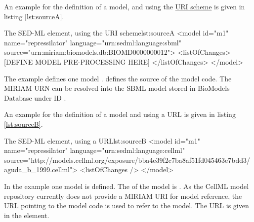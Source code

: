 An example for the definition of a model, and using the  \hyperref[sec:uriScheme]{URI scheme} is given in listing \ref{lst:sourceA}.
%
\begin{myXmlLst}{The SED-ML  element, using the URI scheme}{lst:sourceA}
 <model id="m1" name="repressilator" language="urn:sedml:language:sbml" 
  source="urn:miriam:biomodels.db:BIOMD0000000012">
  <listOfChanges>
   [DEFINE MODEL PRE-PROCESSING HERE]
  </listOfChanges>
 </model>
\end{myXmlLst}
%
The example defines one model .  defines the source of the model code. The MIRIAM URN can be resolved into the SBML model stored in BioModels Database under ID .

An example for the definition of a model and using a URL is given in listing \ref{lst:sourceB}.
%
\begin{myXmlLst}{The SED-ML  element, using a URL}{lst:sourceB}
 <model id="m1" name="repressilator" language="urn:sedml:language:cellml" 
  source="http://models.cellml.org/exposure/bba4e39f2c7ba8af51fd045463e7bdd3/aguda_b_1999.cellml">
  <listOfChanges />
 </model>
\end{myXmlLst}
%
In the example one model is defined. The  of the model is . As the CellML model repository currently does not provide a MIRIAM URI for model reference, the URL pointing to the model code is used to refer to the model. The URL is given in the  element.

